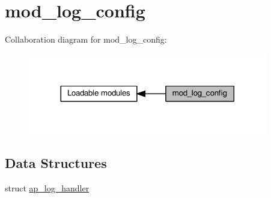 \hypertarget{group__MOD__LOG__CONFIG}{}\section{mod\+\_\+log\+\_\+config}
\label{group__MOD__LOG__CONFIG}
Collaboration diagram for mod\+\_\+log\+\_\+config\+:
\nopagebreak
\begin{figure}[H]
\begin{center}
\leavevmode
\includegraphics[width=296pt]{group__MOD__LOG__CONFIG}
\end{center}
\end{figure}
\subsection*{Data Structures}
\begin{DoxyCompactItemize}
\item 
struct \hyperlink{structap__log__handler}{ap\+\_\+log\+\_\+handler}
\end{DoxyCompactItemize}
